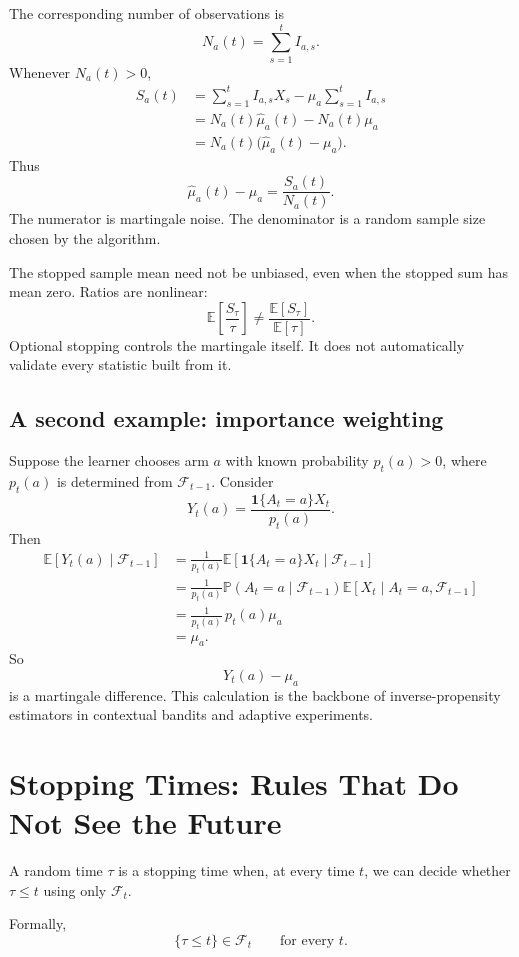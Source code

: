 \documentclass[en,nofont,11pt]{elegantbook}
\newcommand{\E}{\mathbb{E}}
\newcommand{\Pbb}{\mathbb{P}}
\newcommand{\one}{\mathbf{1}}
\newcommand{\F}{\mathcal{F}}
\begin{document}
The corresponding number of observations is
\[
N_a(t)=\sum_{s=1}^{t}I_{a,s}.
\]
Whenever $N_a(t)>0$,
\begin{align*}
S_a(t)
&=\sum_{s=1}^{t}I_{a,s}X_s
-\mu_a\sum_{s=1}^{t}I_{a,s}\\
&=N_a(t)\widehat\mu_a(t)-N_a(t)\mu_a\\
&=N_a(t)\bigl(\widehat\mu_a(t)-\mu_a\bigr).
\end{align*}
Thus
\[
\boxed{
\widehat\mu_a(t)-\mu_a
=
\frac{S_a(t)}{N_a(t)}.
}
\]
The numerator is martingale noise. The denominator is a random sample size chosen by the algorithm.

\begin{thinkbox}
The stopped sample mean need not be unbiased, even when the stopped sum has mean zero. Ratios are nonlinear:
\[
\E\left[\frac{S_\tau}{\tau}\right]
\neq
\frac{\E[S_\tau]}{\E[\tau]}.
\]
Optional stopping controls the martingale itself. It does not automatically validate every statistic built from it.
\end{thinkbox}

\section{A second example: importance weighting}

Suppose the learner chooses arm $a$ with known probability $p_t(a)>0$, where $p_t(a)$ is determined from $\F_{t-1}$. Consider
\[
Y_t(a)=\frac{\one\{A_t=a\}X_t}{p_t(a)}.
\]
Then
\begin{align*}
\E[Y_t(a)\mid\F_{t-1}]
&=\frac{1}{p_t(a)}
\E[\one\{A_t=a\}X_t\mid\F_{t-1}]\\
&=\frac{1}{p_t(a)}
\Pbb(A_t=a\mid\F_{t-1})
\E[X_t\mid A_t=a,\F_{t-1}]\\
&=\frac{1}{p_t(a)}\,p_t(a)\mu_a\\
&=\mu_a.
\end{align*}
So
\[
Y_t(a)-\mu_a
\]
is a martingale difference. This calculation is the backbone of inverse-propensity estimators in contextual bandits and adaptive experiments.

\chapter{Stopping Times: Rules That Do Not See the Future}

A random time $\tau$ is a stopping time when, at every time $t$, we can decide whether $\tau\le t$ using only $\F_t$.

Formally,
\[
\{\tau\le t\}\in\F_t
\qquad\text{for every }t.
\]
\end{document}
